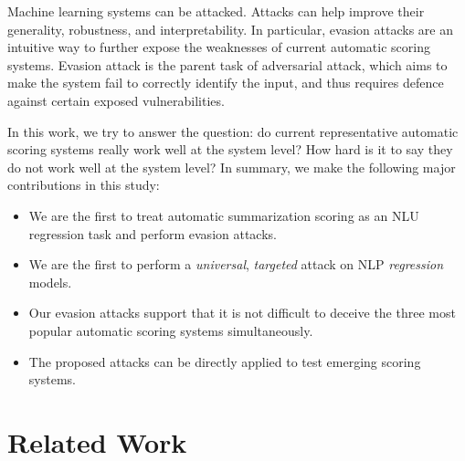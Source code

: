 \documentclass[11pt]{article}
\theoremstyle{remark}
\begin{document}
Machine learning systems can be attacked. Attacks can help improve their generality, robustness, and interpretability. In particular, evasion attacks are an intuitive way to further expose the weaknesses of current automatic scoring systems. Evasion attack is the parent task of adversarial attack, which aims to make the system fail to correctly identify the input, and thus requires defence against certain exposed vulnerabilities.

In this work, we try to answer the question: do current representative automatic scoring systems really work well at the system level? How hard is it to say they do not work well at the system level? In summary, we make the following major contributions in this study:
\begin{itemize}
    \item We are the first to treat automatic summarization scoring as an NLU regression task and perform evasion attacks.
    \item We are the first to perform a \emph{universal}, \emph{targeted} attack on NLP \emph{regression} models.
    \item Our evasion attacks support that it is not difficult to deceive the three most popular automatic scoring systems simultaneously.
    \item The proposed attacks can be directly applied to test emerging scoring systems.

\end{itemize}


\section{Related Work}\label{sec:related}
\end{document}
